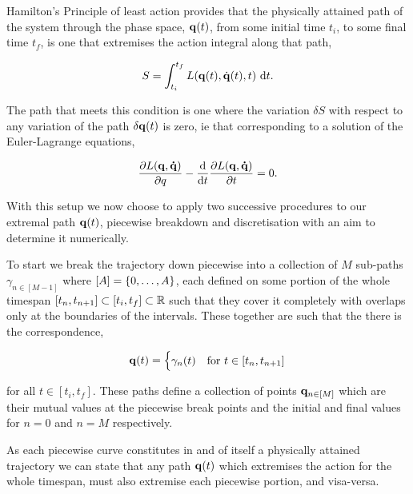 \documentclass[10pt]{iopart}
\begin{document}
Hamilton's Principle of least action \cite{goldsteinClassicalMechanics2000} provides that the physically attained path of the system through the phase space, $\vb q(t)$, from some initial time $t_i$, to some final time $t_f$, is one that extremises the action integral along that path,

\begin{equation}
\label{eq:action-integral}
	S = \int_{t_i}^{t_f} L(\vb{q}(t), \dot{\vb{q}}(t), t) ~\mathrm{d} t.
\end{equation}

The path that meets this condition is one where the variation $\delta S$ with respect to any variation of the path $\delta \vb q(t)$ is zero, ie that corresponding to a solution of the Euler-Lagrange equations,

\begin{equation}
	\label{eq:euler-lagrange}
	\frac{\partial L(\vb q, \vb{\dot q})}{\partial q} - \frac{\dd}{\dd t}\frac{\partial L(\vb q, \vb{\dot q})}{\partial t} = 0.
\end{equation}


With this setup we now choose to apply two successive procedures to our extremal path $\vb q(t)$, piecewise breakdown and discretisation with an aim to determine it numerically.

To start we break the trajectory down piecewise into a collection of $M$ sub-paths $\gamma_{n \in [M - 1]}$ where $[A] = \left\{0, \dots, A\right\}$, each defined on some portion of the whole timespan $[t_n, t_{n + 1}] \subset [t_i, t_f] \subset \mathbb{R}$ such that they cover it completely with overlaps only at the boundaries of the intervals. These together are such that the there is the correspondence,

\begin{equation}
	\vb q(t) = \begin{cases}
		\gamma_n(t) &\text{for~} t \in [t_n, t_{n + 1}]
	\end{cases}
\end{equation}

for all $t \in [t_i, t_f]$. These paths define a collection of points $\vb q_{n \in [M]}$ which are their mutual values at the piecewise break points and the initial and final values for $n = 0$ and $n = M$ respectively.

As each piecewise curve constitutes in and of itself a physically attained trajectory we can state that any path $\vb{q}(t)$ which extremises the action for the whole timespan, must also extremise each piecewise portion, and visa-versa. 
\end{document}
